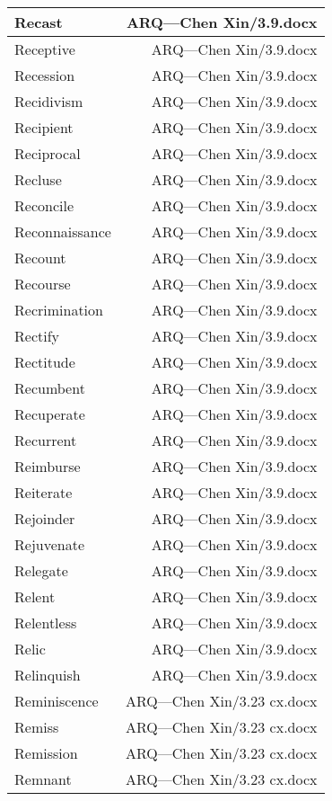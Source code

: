 \documentclass{article}
\begin{document}
\begin{center}
\begin{longtable}{|l|r|}
\hline
Recast  &  ARQ---Chen Xin/3.9.docx\\  
\hline
Receptive  &  ARQ---Chen Xin/3.9.docx\\  
\hline
Recession  &  ARQ---Chen Xin/3.9.docx\\  
\hline
Recidivism  &  ARQ---Chen Xin/3.9.docx\\  
\hline
Recipient  &  ARQ---Chen Xin/3.9.docx\\  
\hline
Reciprocal  &  ARQ---Chen Xin/3.9.docx\\  
\hline
Recluse  &  ARQ---Chen Xin/3.9.docx\\  
\hline
Reconcile  &  ARQ---Chen Xin/3.9.docx\\  
\hline
Reconnaissance  &  ARQ---Chen Xin/3.9.docx\\  
\hline
Recount  &  ARQ---Chen Xin/3.9.docx\\  
\hline
Recourse  &  ARQ---Chen Xin/3.9.docx\\  
\hline
Recrimination  &  ARQ---Chen Xin/3.9.docx\\  
\hline
Rectify  &  ARQ---Chen Xin/3.9.docx\\  
\hline
Rectitude  &  ARQ---Chen Xin/3.9.docx\\  
\hline
Recumbent  &  ARQ---Chen Xin/3.9.docx\\  
\hline
Recuperate  &  ARQ---Chen Xin/3.9.docx\\  
\hline
Recurrent  &  ARQ---Chen Xin/3.9.docx\\  
\hline
Reimburse  &  ARQ---Chen Xin/3.9.docx\\  
\hline
Reiterate  &  ARQ---Chen Xin/3.9.docx\\  
\hline
Rejoinder  &  ARQ---Chen Xin/3.9.docx\\  
\hline
Rejuvenate  &  ARQ---Chen Xin/3.9.docx\\  
\hline
Relegate  &  ARQ---Chen Xin/3.9.docx\\  
\hline
Relent  &  ARQ---Chen Xin/3.9.docx\\  
\hline
Relentless  &  ARQ---Chen Xin/3.9.docx\\  
\hline
Relic  &  ARQ---Chen Xin/3.9.docx\\  
\hline
Relinquish  &  ARQ---Chen Xin/3.9.docx\\  
\hline
Reminiscence  &  ARQ---Chen Xin/3.23 cx.docx\\  
\hline
Remiss  &  ARQ---Chen Xin/3.23 cx.docx\\  
\hline
Remission  &  ARQ---Chen Xin/3.23 cx.docx\\  
\hline
Remnant  &  ARQ---Chen Xin/3.23 cx.docx\\  

\end{longtable}
\end{center}
\end{document}

